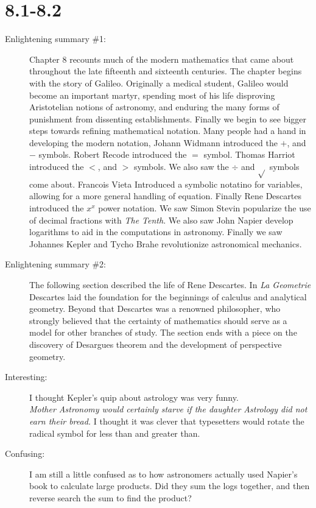 \documentclass[12pt]{article}
\theoremstyle{homework}
\begin{document}
\section*{8.1-8.2}

\begin{description}
\item[Enlightening summary \#1:] Chapter 8 recounts much of the modern mathematics that came about throughout the late 
fifteenth and sixteenth centuries. The chapter begins with the story of Galileo. Originally a medical student, Galileo would become an important martyr, spending most of his life disproving Aristotelian notions of astronomy, 
and enduring the many forms of punishment from dissenting establishments. Finally we begin to see bigger steps towards refining mathematical notation. 
Many people had a hand in developing the modern notation, Johann Widmann introduced the $+$, and $-$ symbols. Robert Recode introduced the $=$ 
symbol. Thomas Harriot introduced the $<$, and $>$ symbols. We also saw the $\div$ and $\sqrt{}$ symbols come about. Francois Vieta Introduced a symbolic notatino 
for variables, allowing for a more general handling of equation. Finally Rene Descartes introduced the $x^x$ power notation.
We saw Simon Stevin popularize the use of decimal fractions with \textit{The Tenth}. We also saw John Napier develop logarithms to aid in the 
computations in astronomy. Finally we saw Johannes Kepler and Tycho Brahe revolutionize astronomical mechanics. 
 


\item[Enlightening summary \#2:] The following section described the life of Rene Descartes. In \textit{La Geometrie} Descartes laid the foundation
for the beginnings of calculus and analytical geometry. Beyond that Descartes was a renowned philosopher, who strongly believed that the certainty of 
mathematics should serve as a model for other branches of study. The section ends with a piece on the discovery of Desargues theorem and the development of perspective geometry.



\item[Interesting:] I thought Kepler's quip about astrology was very funny.\\ 
\noindent\textit{Mother Astronomy would certainly starve if the daughter Astrology did not earn their bread.} 
I thought it was clever that typesetters would rotate the radical symbol for less than and greater than. 
 
\item[Confusing:]  I am still a little confused as to how astronomers actually used Napier's book to calculate large products. Did they 
sum the logs together, and then reverse search the sum to find the product?  

 
\end{description}
\end{document}
